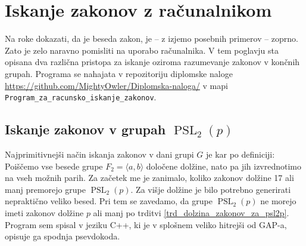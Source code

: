 \section{Iskanje zakonov z računalnikom}
\label{sec_racunalnisko_iskanje}

Na roke dokazati, da je beseda zakon, je -- z izjemo posebnih primerov -- zoprno. 
Zato je zelo naravno pomisliti na uporabo računalnika. 
V tem poglavju sta opisana dva različna pristopa za iskanje  oziroma razumevanje zakonov v končnih grupah. 
Programa se nahajata v repozitoriju diplomske naloge \url{https://github.com/MightyOwler/Diplomska-naloga/} v mapi \texttt{Program\_za\_racunsko\_iskanje\_zakonov}.

\subsection{Iskanje zakonov v grupah $\operatorname{PSL}_2(p)$}\label{sec_iskanje_psl2p}

Najprimitivnejši način iskanja zakonov v dani grupi $G$ je kar po definiciji: Poiščemo vse besede grupe $F_2 = \langle a,b \rangle$ določene dolžine, nato pa jih izvrednotimo na vseh možnih parih.
Za začetek me je zanimalo, koliko zakonov dolžine 17 ali manj premorejo grupe $\operatorname{PSL}_2(p)$. Za višje dolžine je bilo potrebno generirati nepraktično veliko besed. Pri tem se zavedamo, da grupe $\operatorname{PSL}_2(p)$ ne morejo imeti zakonov dolžine $p$ ali manj po trditvi \ref{trd_dolzina_zakonov_za_psl2p}.
Program sem spisal v jeziku C++, ki je v splošnem veliko hitrejši od GAP-a, opisuje ga spodnja psevdokoda.

  
      
  
